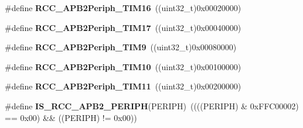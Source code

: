 \begin{DoxyCompactItemize}
\item 
\hypertarget{group__APB2__peripheral_ga739d0a5fe583f07f5b6fa320f2d2e53a}{
\#define {\bfseries RCC\_\-APB2Periph\_\-TIM16}~((uint32\_\-t)0x00020000)}
\label{group__APB2__peripheral_ga739d0a5fe583f07f5b6fa320f2d2e53a}

\item 
\hypertarget{group__APB2__peripheral_ga5a6217b6200d6679dc7bee4522d6038a}{
\#define {\bfseries RCC\_\-APB2Periph\_\-TIM17}~((uint32\_\-t)0x00040000)}
\label{group__APB2__peripheral_ga5a6217b6200d6679dc7bee4522d6038a}

\item 
\hypertarget{group__APB2__peripheral_ga24d0145dc172bc27ed580770cf15e4d9}{
\#define {\bfseries RCC\_\-APB2Periph\_\-TIM9}~((uint32\_\-t)0x00080000)}
\label{group__APB2__peripheral_ga24d0145dc172bc27ed580770cf15e4d9}

\item 
\hypertarget{group__APB2__peripheral_ga75069120ecbe86920b39c2b75c909438}{
\#define {\bfseries RCC\_\-APB2Periph\_\-TIM10}~((uint32\_\-t)0x00100000)}
\label{group__APB2__peripheral_ga75069120ecbe86920b39c2b75c909438}

\item 
\hypertarget{group__APB2__peripheral_gaba591104f4e31b1e8ce98c269035850f}{
\#define {\bfseries RCC\_\-APB2Periph\_\-TIM11}~((uint32\_\-t)0x00200000)}
\label{group__APB2__peripheral_gaba591104f4e31b1e8ce98c269035850f}

\item 
\hypertarget{group__APB2__peripheral_ga89a2b95e60e90a51b26b53cc4c0e7b14}{
\#define {\bfseries IS\_\-RCC\_\-APB2\_\-PERIPH}(PERIPH)~((((PERIPH) \& 0xFFC00002) == 0x00) \&\& ((PERIPH) != 0x00))}
\label{group__APB2__peripheral_ga89a2b95e60e90a51b26b53cc4c0e7b14}

\end{DoxyCompactItemize}
